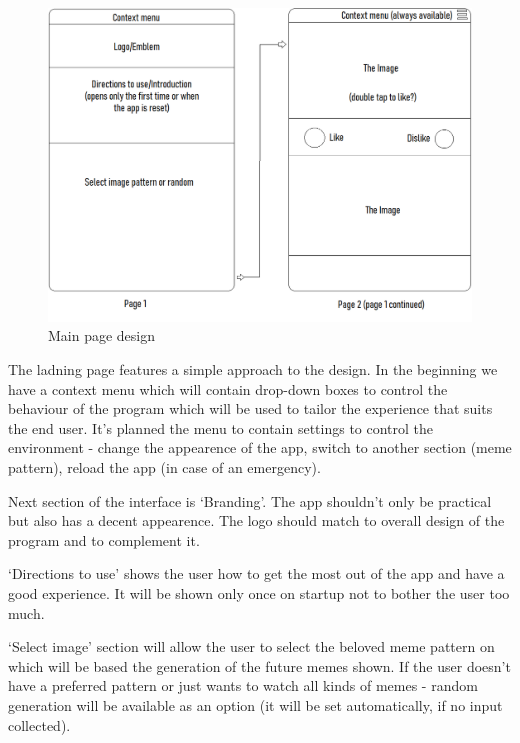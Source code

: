 \documentclass[12pt]{report}
\begin{document}
    \paragraph{}

    \begin{figure}[htbp]
        \centerline{\includegraphics[scale=.5]{img/system_ui.png}}
        \label{system_ui}
        \caption{Main page design}
    \end{figure}

    The ladning page features a simple approach to the design. In the beginning we have a context menu which will contain drop-down boxes to control the behaviour of the program which will be used to tailor the experience that suits the end user. It's planned the menu to contain settings to control the environment - change
    the appearence of the app, switch to another section (meme pattern), reload the app (in case of an emergency). 

    Next section of the interface is `Branding'. The app shouldn't only be practical but also has a decent appearence. The logo should match to overall design of the program and to complement it.

    `Directions to use' shows the user how to get the most out of the app and have a good experience. It will be shown only once on startup not to bother the user too much.

    `Select image' section will allow the user to select the beloved meme pattern on which will be based the generation of the future memes shown. If the user doesn't have a preferred pattern or just wants to watch all kinds of memes - random generation will be available as an option (it will be set automatically, if no input collected).
\end{document}
